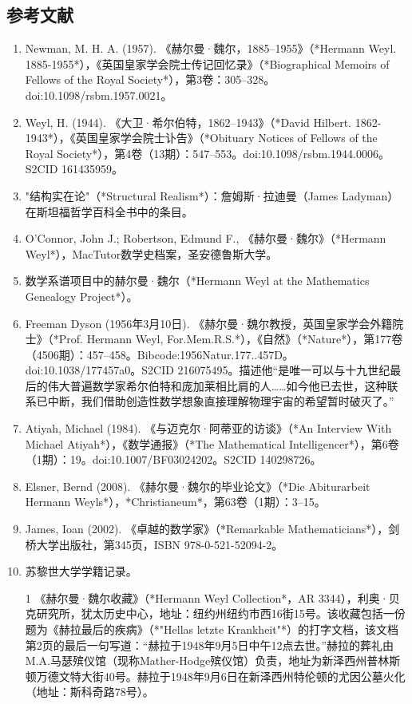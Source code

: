 \subsection{参考文献}
\begin{enumerate}
\item Newman, M. H. A. (1957). 《赫尔曼·魏尔，1885–1955》（*Hermann Weyl. 1885-1955*），《英国皇家学会院士传记回忆录》（*Biographical Memoirs of Fellows of the Royal Society*），第3卷：305–328。doi:10.1098/rsbm.1957.0021。  
\item Weyl, H. (1944). 《大卫·希尔伯特，1862–1943》（*David Hilbert. 1862-1943*），《英国皇家学会院士讣告》（*Obituary Notices of Fellows of the Royal Society*），第4卷（13期）：547–553。doi:10.1098/rsbm.1944.0006。S2CID 161435959。  
\item "结构实在论"（*Structural Realism*）：詹姆斯·拉迪曼（James Ladyman）在斯坦福哲学百科全书中的条目。  
\item O'Connor, John J.; Robertson, Edmund F., 《赫尔曼·魏尔》（*Hermann Weyl*），MacTutor数学史档案，圣安德鲁斯大学。  
\item 数学系谱项目中的赫尔曼·魏尔（*Hermann Weyl at the Mathematics Genealogy Project*）。  
\item Freeman Dyson (1956年3月10日). 《赫尔曼·魏尔教授，英国皇家学会外籍院士》（*Prof. Hermann Weyl, For.Mem.R.S.*），《自然》（*Nature*），第177卷（4506期）：457–458。Bibcode:1956Natur.177..457D。doi:10.1038/177457a0。S2CID 216075495。描述他“是唯一可以与十九世纪最后的伟大普遍数学家希尔伯特和庞加莱相比肩的人……如今他已去世，这种联系已中断，我们借助创造性数学想象直接理解物理宇宙的希望暂时破灭了。”  
\item Atiyah, Michael (1984). 《与迈克尔·阿蒂亚的访谈》（*An Interview With Michael Atiyah*），《数学通报》（*The Mathematical Intelligencer*），第6卷（1期）：19。doi:10.1007/BF03024202。S2CID 140298726。  
\item Elsner, Bernd (2008). 《赫尔曼·魏尔的毕业论文》（*Die Abiturarbeit Hermann Weyls*），*Christianeum*，第63卷（1期）：3–15。  
\item James, Ioan (2002). 《卓越的数学家》（*Remarkable Mathematicians*），剑桥大学出版社，第345页，ISBN 978-0-521-52094-2。  
\item 苏黎世大学学籍记录。  
\item [1] 《赫尔曼·魏尔收藏》（*Hermann Weyl Collection*，AR 3344），利奥·贝克研究所，犹太历史中心，地址：纽约州纽约市西16街15号。该收藏包括一份题为《赫拉最后的疾病》（*"Hellas letzte Krankheit"*）的打字文档，该文档第2页的最后一句写道：“赫拉于1948年9月5日中午12点去世。”赫拉的葬礼由M.A.马瑟殡仪馆（现称Mather-Hodge殡仪馆）负责，地址为新泽西州普林斯顿万德文特大街40号。赫拉于1948年9月6日在新泽西州特伦顿的尤因公墓火化（地址：斯科奇路78号）。  

\end{enumerate}
